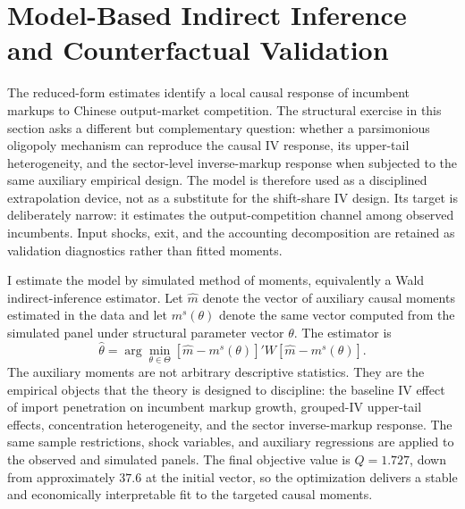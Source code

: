 \documentclass[11pt,a4paper]{article}
\begin{document}
\section{Model-Based Indirect Inference and Counterfactual Validation}

The reduced-form estimates identify a local causal response of incumbent markups to Chinese output-market competition. The structural exercise in this section asks a different but complementary question: whether a parsimonious oligopoly mechanism can reproduce the causal IV response, its upper-tail heterogeneity, and the sector-level inverse-markup response when subjected to the same auxiliary empirical design. The model is therefore used as a disciplined extrapolation device, not as a substitute for the shift-share IV design. Its target is deliberately narrow: it estimates the output-competition channel among observed incumbents. Input shocks, exit, and the accounting decomposition are retained as validation diagnostics rather than fitted moments.

I estimate the model by simulated method of moments, equivalently a Wald indirect-inference estimator. Let \(\widehat m\) denote the vector of auxiliary causal moments estimated in the data and let \(m^{s}(\theta)\) denote the same vector computed from the simulated panel under structural parameter vector \(\theta\). The estimator is
\begin{equation}
\widehat\theta
=\arg\min_{\theta\in\Theta}
\left[\widehat m-m^{s}(\theta)\right]'
W
\left[\widehat m-m^{s}(\theta)\right].
\end{equation}
The auxiliary moments are not arbitrary descriptive statistics. They are the empirical objects that the theory is designed to discipline: the baseline IV effect of import penetration on incumbent markup growth, grouped-IV upper-tail effects, concentration heterogeneity, and the sector inverse-markup response. The same sample restrictions, shock variables, and auxiliary regressions are applied to the observed and simulated panels. The final objective value is \(Q=1.727\), down from approximately \(37.6\) at the initial vector, so the optimization delivers a stable and economically interpretable fit to the targeted causal moments.
\end{document}
